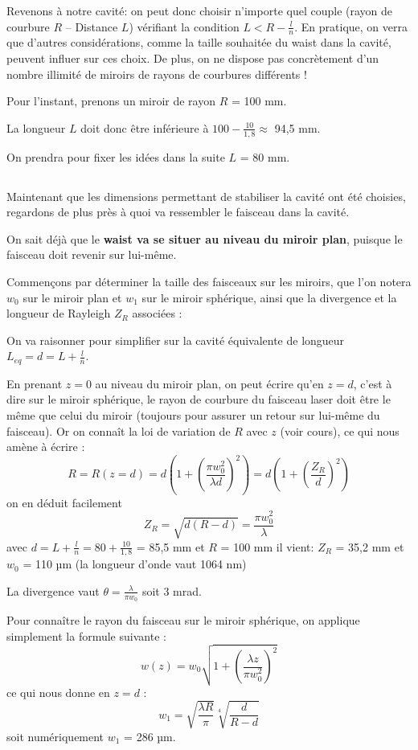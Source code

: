\documentclass{book}
\begin{document}
Revenons à notre cavité: on peut donc choisir n'importe quel couple (rayon de courbure \(R\) – Distance \(L\)) vérifiant la condition \(L < R-\frac ln\). En pratique, on verra que d'autres considérations, comme la taille souhaitée du waist dans la cavité, peuvent influer sur ces choix. De plus, on ne dispose pas concrètement d'un nombre illimité de miroirs de rayons de courbures différents !

Pour l'instant, prenons un miroir de rayon \(R\) = 100 mm.

La longueur \(L\) doit donc être inférieure à \(100-\frac {10}{1,8} \approx\) 94,5 mm.

On prendra pour fixer les idées dans la suite \(L\) = 80 mm.

\subsection{}

Maintenant que les dimensions permettant de stabiliser la cavité ont été choisies, regardons de plus près à quoi va ressembler le faisceau dans la cavité.

On sait déjà que le \textbf{\color{red}waist va se situer au niveau du miroir plan}, puisque le faisceau doit revenir sur lui-même.

Commençons par déterminer la taille des faisceaux sur les miroirs, que l'on notera \(w_0\) sur le miroir plan et \(w_1\) sur le miroir sphérique, ainsi que la divergence et la longueur de Rayleigh \(Z_R\) associées :

On va raisonner pour simplifier sur la cavité équivalente de longueur \(L_{eq}=d=L+\frac ln\).

En prenant \(z=0\) au niveau du miroir plan, on peut écrire qu'en \(z = d\), c'est à dire sur le miroir sphérique, le rayon de courbure du faisceau laser doit être le même que celui du miroir (toujours pour assurer un retour sur lui-même du faisceau). Or on connaît la loi de variation de \(R\) avec \(z\) (voir cours), ce qui nous amène à écrire :
\[R=R(z=d)=d\left(1+\left(\frac{\pi w_0^2}{\lambda d}\right)^2\right)= d\left(1+\left(\frac{Z_R}d\right)^2\right)\]
on en déduit facilement
\[Z_R=\sqrt{d(R-d)}=\frac {\pi w_0^2}\lambda\]
avec \(d = L+\frac ln = 80+\frac {10}{1,8}\) = 85,5 mm et \(R\) = 100 mm il vient: \(Z_R\) = 35,2 mm et \(w_0\) = 110 µm (la longueur d'onde vaut 1064 nm)

La divergence vaut \(\theta = \frac \lambda {\pi w_0}\) soit 3 mrad.

Pour connaître le rayon du faisceau sur le miroir sphérique, on applique simplement la formule suivante :
\[w(z)=w_0\sqrt{1+\left(\frac {\lambda z}{\pi w_0^2}\right)^2}\]
ce qui nous donne en \(z=d\) :
\[w_1=\sqrt{\frac {\lambda R}\pi} \sqrt[4]{\frac d{R-d}}\]
soit numériquement \(w_1\) = 286 µm.
\end{document}
